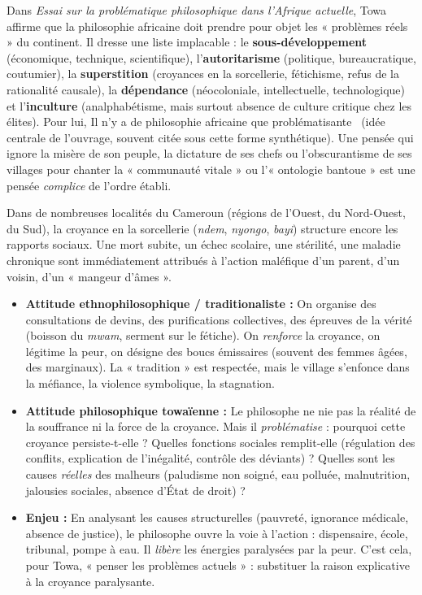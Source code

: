 \documentclass[11pt]{article}
\newcommand{\cle}[1]{{\popxbold\color{popdark}#1}}
\begin{document}
\begin{propriete}
Dans \emph{Essai sur la problématique philosophique dans l'Afrique actuelle}, Towa affirme que la philosophie africaine doit prendre pour objet les « problèmes réels » du continent. Il dresse une liste implacable : le \textbf{sous-développement} (économique, technique, scientifique), l'\textbf{autoritarisme} (politique, bureaucratique, coutumier), la \textbf{superstition} (croyances en la sorcellerie, fétichisme, refus de la rationalité causale), la \textbf{dépendance} (néocoloniale, intellectuelle, technologique) et l'\textbf{inculture} (analphabétisme, mais surtout absence de culture critique chez les élites). Pour lui, \guillemotleft Il n'y a de philosophie africaine que problématisante \guillemotright\ (idée centrale de l'ouvrage, souvent citée sous cette forme synthétique). Une pensée qui ignore la misère de son peuple, la dictature de ses chefs ou l'obscurantisme de ses villages pour chanter la « communauté vitale » ou l'« ontologie bantoue » est une pensée \emph{complice} de l'ordre établi.
\end{propriete}

\begin{exemplebox}
Dans de nombreuses localités du Cameroun (régions de l'Ouest, du Nord-Ouest, du Sud), la croyance en la sorcellerie (\emph{ndem}, \emph{nyongo}, \emph{bayi}) structure encore les rapports sociaux. Une mort subite, un échec scolaire, une stérilité, une maladie chronique sont immédiatement attribués à l'action maléfique d'un parent, d'un voisin, d'un « mangeur d'âmes ».
\begin{itemize}
    \item \textbf{Attitude ethnophilosophique / traditionaliste :} On organise des consultations de devins, des purifications collectives, des épreuves de la vérité (boisson du \emph{mwam}, serment sur le fétiche). On \emph{renforce} la croyance, on légitime la peur, on désigne des boucs émissaires (souvent des femmes âgées, des marginaux). La « tradition » est respectée, mais le village s'enfonce dans la méfiance, la violence symbolique, la stagnation.
    \item \textbf{Attitude philosophique towaïenne :} Le philosophe ne nie pas la réalité de la souffrance ni la force de la croyance. Mais il \emph{problématise} : pourquoi cette croyance persiste-t-elle ? Quelles fonctions sociales remplit-elle (régulation des conflits, explication de l'inégalité, contrôle des déviants) ? Quelles sont les causes \emph{réelles} des malheurs (paludisme non soigné, eau polluée, malnutrition, jalousies sociales, absence d'État de droit) ?
    \item \textbf{Enjeu :} En analysant les causes structurelles (pauvreté, ignorance médicale, absence de justice), le philosophe ouvre la voie à l'action : dispensaire, école, tribunal, pompe à eau. Il \emph{libère} les énergies paralysées par la peur. C'est cela, pour Towa, « penser les problèmes actuels » : substituer la \cle{raison explicative} à la \cle{croyance paralysante}.
\end{itemize}
\end{exemplebox}
\end{document}
